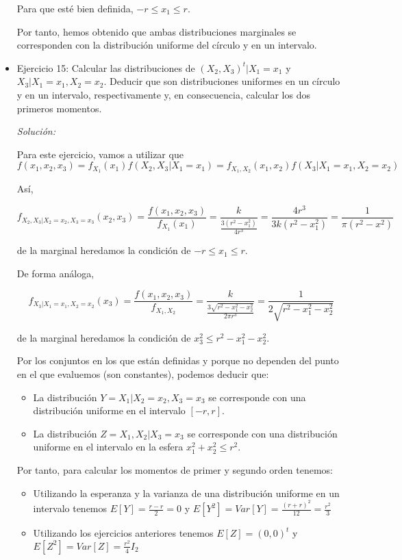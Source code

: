 \documentclass{article}
\theoremstyle{theorem-style}  %
\theoremstyle{definition}
\theoremstyle{example-style}
\begin{document}
\begin{itemize}
		Para que esté bien definida, $-r \leq x_1 \leq r$.
		
		Por tanto, hemos obtenido que ambas distribuciones marginales se corresponden con la distribución uniforme del círculo y en un intervalo. 
		
		\item Ejercicio 15:  Calcular las distribuciones de $(X_2, X_3)^t|X_1=x_1$ y $X_3|X_1=x_1, X_2=x_2$. Deducir que son distribuciones uniformes en un círculo y en un intervalo, respectivamente y, en consecuencia, calcular los dos primeros momentos.
		
		\textit{Solución: }
		
		Para este ejercicio, vamos a utilizar que $f(x_1, x_2, x_3) = f_{X_1}(x_1) f(X_2, X_3 | X_1 = x_1) = f_{X_1 , X_2}(x_1, x_2) f(X_3 | X_1 = x_1, X_2 = x_2) $
		
		Así, 
		
		\[
			f_{X_2, X_3| X_2 = x_2, X_3 = x_3}(x_2, x_3) =  \frac{f(x_1,x_2,x_3)} {f_{X_1} (x_1)} = \frac{k}{ \frac{3 (r^2 - x_1^2)}{4 r^3} } = \frac{4 r^3}{3 k (r^2 - x_1^2)} = \frac{1}{\pi (r^2 - x^2)} 
		\]
		
		de la marginal heredamos la condición de $-r \leq x_1 \leq r$.
		
		De forma análoga,
		
		\[
			f_{ X_3| X_1 = x_1, X_2 = x_2}(x_3) = \frac{f(x_1, x_2, x_3)}{f_{X_1, X_2}}  = \frac{k}{\frac{3 \sqrt{r^2 - x_1^2 - x_2^2}}{2 \pi r^3}} = \frac{1}{ 2 \sqrt{r^2 - x_1^2 - x_2^2}}
		\] 
		
		de la marginal heredamos la condición de $x_3 ^ 2 \leq r^2 - x_1^2 - x_2^2$.
		
		Por los conjuntos en los que están definidas y porque no dependen del punto en el que evaluemos (son constantes), podemos deducir que:
		
		\begin{itemize}
			\item La distribución $Y = X_1|X_2 = x_2, X_3 = x_3$ se corresponde con una distribución uniforme en el intervalo $[-r,r]$.
			
			\item La distribución $Z =X_1, X_2|X_3 = x_3$ se corresponde con una distribución uniforme en el intervalo  en la esfera $x_1^2 + x_2^2 \leq r^2$.
		\end{itemize}
	
		Por tanto, para calcular los momentos de primer y segundo orden tenemos:
		\begin{itemize}
			\item Utilizando la esperanza y la varianza de una distribución uniforme en un intervalo tenemos $E[Y] = \frac{r -r}{2} = 0$ y $E[Y^2] = Var[Y] = \frac{(r+r)^2}{12} = \frac{r^2}{3}$
			\item Utilizando los ejercicios anteriores tenemos $E[Z] = (0,0)^t$ y $E[Z^2] = Var[Z] = \frac{r^2}{4}I_2$ 
		\end{itemize}
		
	\end{itemize}
	
\end{document}
